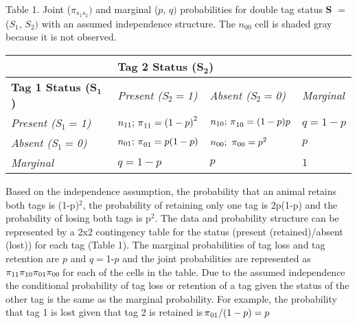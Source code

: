 \documentclass{article}
\begin{document}
Table 1. Joint ($\pi_{s_{1}s_{2}})$ and marginal ($p$, $q)$ probabilities for 
double tag status \textbf{S} $=$ ($S_{\mathrm{1}}$, $S_{\mathrm{2}})$ with an 
assumed independence structure. The $n_{00}$ cell is shaded gray because it 
is not observed. 

\begin{table}[htbp]
\begin{center}
\begin{tabular}{|l|p{112pt}|p{130pt}|p{135pt}|}
\hline
& 
\multicolumn{2}{|p{243pt}|}{\textbf{Tag 2 Status (S}$_{\mathrm{\mathbf{2}}}$\textbf{)}} & 
 \\
\hline
\textbf{Tag 1 Status (S}$_{\mathrm{\mathbf{1}}}$\textbf{)}& 
\textit{Present (S}$_{2}=$\textit{1)}& 
\textit{Absent (S}$_{2}=$\textit{0)}& 
\textit{Marginal} \\
\hline
\textit{Present (S}$_{1}=$\textit{1)}& 
${n_{11};\thinspace \pi }_{11}={(1-p)}^{2}$& 
${n_{10};\thinspace \pi }_{10}=(1-p)p$& 
$q=1-p$ \\
\hline
\textit{Absent (S}$_{1}=$\textit{0)}& 
${n_{01};\thinspace \pi }_{01}=p(1-p)$& 
$n_{00};\thinspace {\thinspace \pi }_{00}=p^{2}$& 
$p$ \\
\hline
\textit{Marginal}& 
$q=1-p$& 
$p$& 
$1$ \\
\hline
\end{tabular}
\label{tab1}
\end{center}
\end{table}

Based on the independence assumption, the probability that an animal retains 
both tags is (1-p)$^{\mathrm{2}}$, the probability of retaining only one tag 
is 2p(1-p) and the probability of losing both tags is p$^{\mathrm{2}}$. The 
data and probability structure can be represented by a 2x2 contingency table 
for the status (present (retained)/absent (lost)) for each tag (Table 1). 
The marginal probabilities of tag loss and tag retention are $p$ and 
$q=$1-$p$ and the joint probabilities are represented as $\pi_{11}\pi_{10}\pi 
_{01}\pi_{00}\thinspace $for each of the cells in the table. Due to the 
assumed independence the conditional probability of tag loss or retention of 
a tag given the status of the other tag is the same as the marginal 
probability. For example, the probability that tag 1 is lost given that tag 
2 is retained is${\thinspace \pi }_{01}/(1-p)=p\thinspace $
\end{document}
